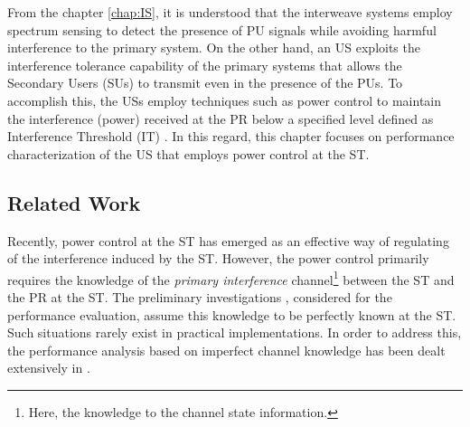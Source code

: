 From the chapter \ref{chap:IS}, it is understood that the interweave systems employ spectrum sensing to detect the presence of PU signals while avoiding harmful interference to the primary system. On the other hand, an US exploits the interference tolerance capability of the primary systems that allows the Secondary Users (SUs) to transmit even in the presence of the PUs. To accomplish this, the USs employ techniques such as power control to maintain the interference (power) received at the PR below a specified level defined as Interference Threshold (IT) \cite{Xing07}. In this regard, this chapter focuses on performance characterization of the US that employs power control at the ST.  

\subsection{Related Work}
 Recently, power control at the ST has emerged as an effective way of regulating of the interference induced by the ST. However, the power control primarily requires the knowledge of the \textit{primary interference} channel\footnote{Here, the knowledge  to the channel state information.} between the ST and the PR at the ST. The preliminary investigations \cite{Xing07, Ghasemi07, Sura08, Musa09_, Kang09}, considered for the performance evaluation, assume this knowledge to be perfectly known at the ST. Such situations rarely exist in practical implementations. In order to address this, the performance analysis based on imperfect channel knowledge has been dealt extensively in \cite{Musa09, Suraweera10, Kim12, Alou12, Stat12, Alou13, Zhang13, Smith13, Li13, Kerr14, Sharma15}.

